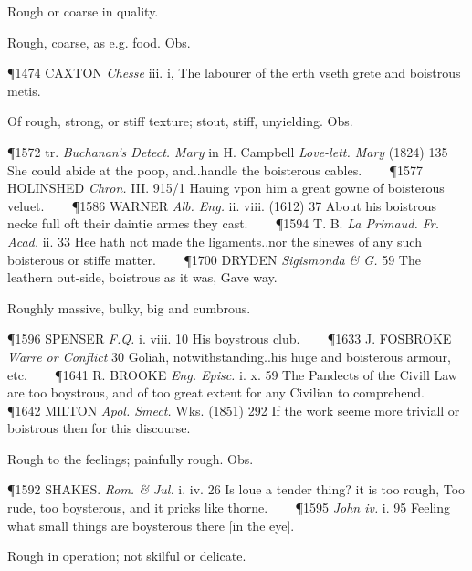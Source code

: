 \begin{description}[wide, labelwidth=!, labelindent=0pt]
\noindent {}

\vspace{-0.3cm}

\begin{myenumerate}

 Rough or coarse in quality.

 Rough, coarse, as e.g. food. Obs.

\P 1474 CAXTON  \textit{Chesse} iii. i, The labourer of the erth vseth grete and boistrous metis.

 Of rough, strong, or stiff texture; stout, stiff, unyielding. Obs.

\P 1572 tr.  \textit{Buchanan's Detect. Mary} in H. Campbell \textit{Love-lett. Mary} (1824) 135 She could abide at the poop, and..handle the boisterous cables.    
\P 1577 HOLINSHED  \textit{Chron.} III. 915/1 Hauing vpon him a great gowne of boisterous veluet.    
\P 1586 WARNER  \textit{Alb. Eng.} ii. viii. (1612) 37 About his boistrous necke full oft their daintie armes they cast.    
\P 1594 T. B. \textit{La Primaud. Fr. Acad.} ii. 33 Hee hath not made the ligaments..nor the sinewes of any such boisterous or stiffe matter.    
\P 1700 DRYDEN  \textit{Sigismonda \& G.} 59 The leathern out-side, boistrous as it was, Gave way.

 Roughly massive, bulky, big and cumbrous.

\P 1596 SPENSER  \textit{F.Q.} i. viii. 10 His boystrous club.    
\P 1633 J. FOSBROKE  \textit{Warre or Conflict} 30 Goliah, notwithstanding..his huge and boisterous armour, etc.    
\P 1641 R. BROOKE  \textit{Eng. Episc.} i. x. 59 The Pandects of the Civill Law are too boystrous, and of too great extent for any Civilian to comprehend.    
\P 1642 MILTON  \textit{Apol. Smect.} Wks. (1851) 292 If the work seeme more triviall or boistrous then for this discourse.

 Rough to the feelings; painfully rough. Obs.

\P 1592 SHAKES.  \textit{Rom. \& Jul.} i. iv. 26 Is loue a tender thing? it is too rough, Too rude, too boysterous, and it pricks like thorne.    
\P 1595 \textit{John iv.} i. 95 Feeling what small things are boysterous there [in the eye].

 Rough in operation; not skilful or delicate.


\end{myenumerate}
\end{description}
